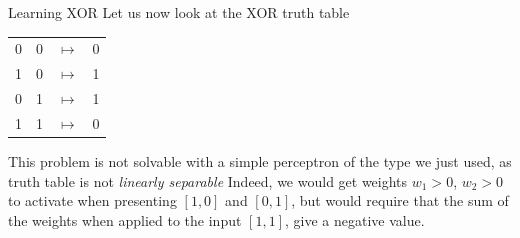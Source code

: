 \documentclass[aspectratio=169]{beamer}\usepackage[]{graphicx}\usepackage[]{xcolor}
\makeatletter
\newcommand{\hlnum}[1]{\textcolor[rgb]{0.686,0.059,0.569}{#1}}%
\newcommand{\hlsng}[1]{\textcolor[rgb]{0.192,0.494,0.8}{#1}}%
\newcommand{\hlopt}[1]{\textcolor[rgb]{0,0,0}{#1}}%
\newcommand{\hldef}[1]{\textcolor[rgb]{0.345,0.345,0.345}{#1}}%
\newcommand{\hlkwb}[1]{\textcolor[rgb]{0.69,0.353,0.396}{#1}}%
\newcommand{\hlkwc}[1]{\textcolor[rgb]{0.333,0.667,0.333}{#1}}%
\newcommand{\hlkwd}[1]{\textcolor[rgb]{0.737,0.353,0.396}{\textbf{#1}}}%
\newenvironment{kframe}{%
 \def\at@end@of@kframe{}%
 \ifinner\ifhmode%
  \def\at@end@of@kframe{\end{minipage}}%
  \begin{minipage}{\columnwidth}%
 \fi\fi%
 \def\FrameCommand##1{\hskip\@totalleftmargin \hskip-\fboxsep
 \colorbox{shadecolor}{##1}\hskip-\fboxsep
     \hskip-\linewidth \hskip-\@totalleftmargin \hskip\columnwidth}%
 \MakeFramed {\advance\hsize-\width
   \@totalleftmargin\z@ \linewidth\hsize
   \@setminipage}}%
 {\par\unskip\endMakeFramed%
 \at@end@of@kframe}
\newenvironment{knitrout}{}{} %
\makeatother
\begin{document}

\begin{frame}{Learning XOR}
    Let us now look at the XOR truth table
    \begin{center}
        \begin{tabular}{cccc}
            0 & 0 & $\mapsto$ & 0 \\
            1 & 0 & $\mapsto$ & 1 \\
            0 & 1 & $\mapsto$ & 1 \\
            1 & 1 & $\mapsto$ & 0 \\
        \end{tabular}
    \end{center}
    This problem is not solvable with a simple perceptron of the type we just used, as truth table is not \emph{linearly separable}
    \vfill
    Indeed, we would get weights $w_1>0$, $w_2>0$ to activate when presenting $[1,0]$ and $[0,1]$, but would require that the sum of the weights when applied to the input $[1,1]$, give a negative value.
\end{frame}
\end{document}
